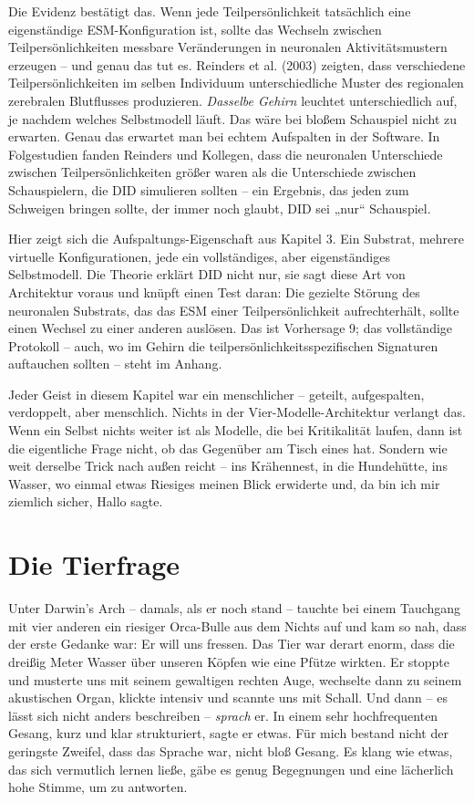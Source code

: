\documentclass[11pt, twoside, openright]{book}
\begin{document}
Die Evidenz bestätigt das. Wenn jede Teilpersönlichkeit tatsächlich eine eigenständige ESM-Konfiguration ist, sollte das Wechseln zwischen Teilpersönlichkeiten messbare Veränderungen in neuronalen Aktivitätsmustern erzeugen -- und genau das tut es. Reinders et al. (2003) zeigten, dass verschiedene Teilpersönlichkeiten im selben Individuum unterschiedliche Muster des regionalen zerebralen Blutflusses produzieren. \textit{Dasselbe Gehirn} leuchtet unterschiedlich auf, je nachdem welches Selbstmodell läuft. Das wäre bei bloßem Schauspiel nicht zu erwarten. Genau das erwartet man bei echtem Aufspalten in der Software. In Folgestudien fanden Reinders und Kollegen, dass die neuronalen Unterschiede zwischen Teilpersönlichkeiten größer waren als die Unterschiede zwischen Schauspielern, die DID simulieren sollten -- ein Ergebnis, das jeden zum Schweigen bringen sollte, der immer noch glaubt, DID sei „nur“ Schauspiel.

Hier zeigt sich die Aufspaltungs-Eigenschaft aus Kapitel 3. Ein Substrat, mehrere virtuelle Konfigurationen, jede ein vollständiges, aber eigenständiges Selbstmodell. Die Theorie erklärt DID nicht nur, sie sagt diese Art von Architektur voraus und knüpft einen Test daran: Die gezielte Störung des neuronalen Substrats, das das ESM einer Teilpersönlichkeit aufrechterhält, sollte einen Wechsel zu einer anderen auslösen. Das ist Vorhersage 9; das vollständige Protokoll -- auch, wo im Gehirn die teilpersönlichkeitsspezifischen Signaturen auftauchen sollten -- steht im Anhang.

Jeder Geist in diesem Kapitel war ein menschlicher -- geteilt, aufgespalten, verdoppelt, aber menschlich. Nichts in der Vier-Modelle-Architektur verlangt das. Wenn ein Selbst nichts weiter ist als Modelle, die bei Kritikalität laufen, dann ist die eigentliche Frage nicht, ob das Gegenüber am Tisch eines hat. Sondern wie weit derselbe Trick nach außen reicht -- ins Krähennest, in die Hundehütte, ins Wasser, wo einmal etwas Riesiges meinen Blick erwiderte und, da bin ich mir ziemlich sicher, Hallo sagte.

\chapter{Die Tierfrage}

Unter Darwin's Arch -- damals, als er noch stand -- tauchte bei einem Tauchgang mit vier anderen ein riesiger Orca-Bulle aus dem Nichts auf und kam so nah, dass der erste Gedanke war: Er will uns fressen. Das Tier war derart enorm, dass die dreißig Meter Wasser über unseren Köpfen wie eine Pfütze wirkten. Er stoppte und musterte uns mit seinem gewaltigen rechten Auge, wechselte dann zu seinem akustischen Organ, klickte intensiv und scannte uns mit Schall. Und dann -- es lässt sich nicht anders beschreiben -- \textit{sprach} er. In einem sehr hochfrequenten Gesang, kurz und klar strukturiert, sagte er etwas. Für mich bestand nicht der geringste Zweifel, dass das Sprache war, nicht bloß Gesang. Es klang wie etwas, das sich vermutlich lernen ließe, gäbe es genug Begegnungen und eine lächerlich hohe Stimme, um zu antworten.
\end{document}
